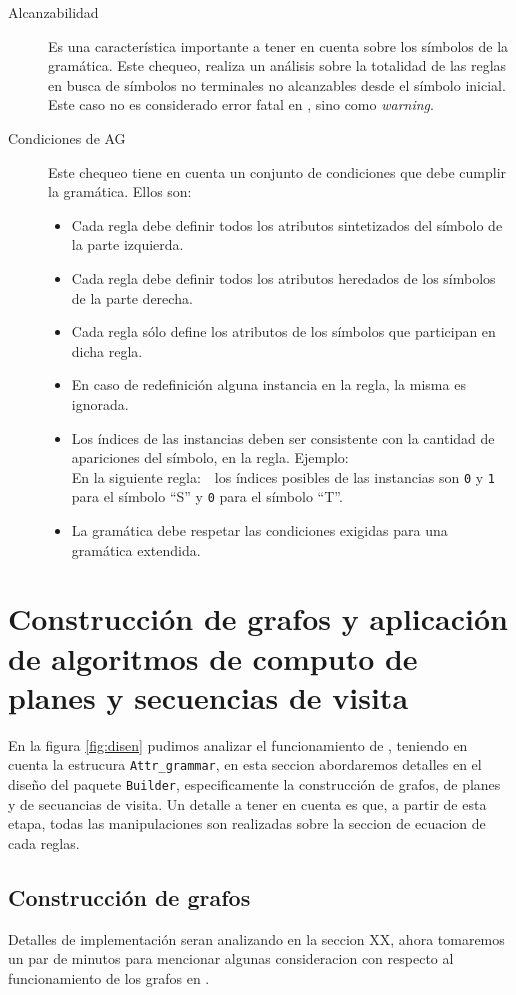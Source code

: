 \begin{description}
\item [Alcanzabilidad] Es una característica importante a tener en cuenta sobre los símbolos de la gramática. Este chequeo, realiza un análisis sobre la totalidad de las reglas en busca de símbolos no terminales no alcanzables desde el símbolo inicial. Este caso no es considerado error fatal en \maggen, sino como \textit{warning}.
\item [Condiciones de AG] Este chequeo tiene en cuenta un conjunto de condiciones que debe cumplir la gramática. Ellos son:
\begin{itemize}
\item Cada regla debe definir todos los atributos sintetizados del símbolo de la parte izquierda.
\item Cada regla debe definir todos los atributos heredados de los símbolos de la parte derecha.
\item Cada regla sólo define los atributos de los símbolos que participan en dicha regla.
\item En caso de redefinición alguna instancia en la regla, la misma es ignorada.
\item Los índices de las instancias deben ser consistente con la cantidad de apariciones del símbolo, en la regla. Ejemplo: \\En la siguiente regla:\ \ los índices posibles de las instancias son \texttt{0} y \texttt{1} para el símbolo ``S'' y \texttt{0} para el símbolo ``T''.
\item La gramática debe respetar las condiciones exigidas para una gramática extendida. 
\end{itemize}
\end{description}

\section{Construcción de grafos y aplicación de algoritmos de computo de planes y secuencias de visita}
En la figura \ref{fig:disen} pudimos analizar el funcionamiento de \maggen, teniendo en cuenta la estrucura \texttt{Attr\_grammar}, en esta seccion abordaremos detalles en el diseño del paquete \texttt{Builder}, especificamente la construcción de grafos, de planes y de secuancias de visita. Un detalle a tener en cuenta es que, a partir de esta etapa,  todas las manipulaciones son realizadas sobre la seccion de ecuacion de cada reglas.

\subsection*{Construcción de grafos}
Detalles de implementación seran analizando en la seccion XX, ahora tomaremos un par de minutos para mencionar algunas consideracion con respecto al funcionamiento de los grafos en \maggen.


